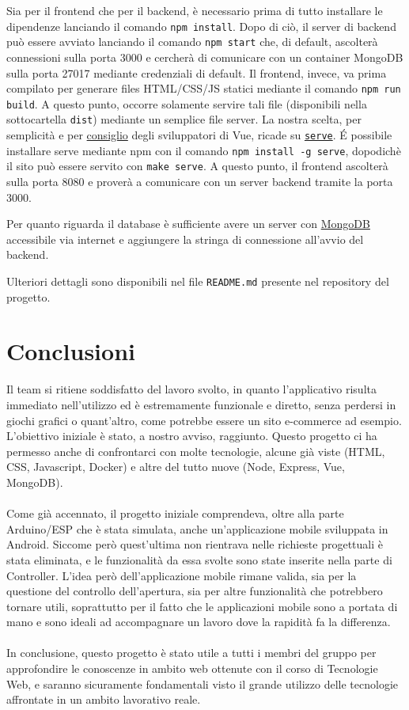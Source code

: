 \documentclass[a4paper,12pt]{report}
\newcommand{\mongodb}{\href{https://www.mongodb.com/it-it}{MongoDB} }
\begin{document}
Sia per il frontend che per il backend, è necessario prima di tutto installare le dipendenze lanciando il comando \texttt{npm install}. Dopo di ciò, il server di backend può essere avviato lanciando il comando \texttt{npm start} che, di default, ascolterà connessioni sulla porta 3000 e cercherà di comunicare con un container MongoDB sulla porta 27017 mediante credenziali di default. Il frontend, invece, va prima compilato per generare files HTML/CSS/JS statici mediante il comando \texttt{npm run build}. A questo punto, occorre solamente servire tali file (disponibili nella sottocartella \texttt{dist}) mediante un semplice file server. La nostra scelta, per semplicità e per \href{https://cli.vuejs.org/guide/deployment.html}{consiglio} degli sviluppatori di Vue, ricade su \href{https://www.npmjs.com/package/serve}{\texttt{serve}}. \'E possibile installare serve mediante npm con il comando \texttt{npm install -g serve}, dopodichè il sito può essere servito con \texttt{make serve}. A questo punto, il frontend ascolterà sulla porta 8080 e proverà a comunicare con un server backend tramite la porta 3000.

Per quanto riguarda il database è sufficiente avere un server con \mongodb accessibile via internet e aggiungere la stringa di connessione all'avvio del backend.

Ulteriori dettagli sono disponibili nel file \texttt{README.md} presente nel repository del progetto.

\clearpage
\chapter{Conclusioni}

Il team si ritiene soddisfatto del lavoro svolto, in quanto l'applicativo risulta immediato nell'utilizzo ed è estremamente funzionale e diretto, senza perdersi in giochi grafici o quant'altro, come potrebbe essere un sito e-commerce ad esempio. L'obiettivo iniziale è stato, a nostro avviso, raggiunto. Questo progetto ci ha permesso anche di confrontarci con molte tecnologie, alcune già viste (HTML, CSS, Javascript, Docker) e altre del tutto nuove (Node, Express, Vue, MongoDB).\\\\
Come già accennato, il progetto iniziale comprendeva, oltre alla parte Arduino/ESP che è stata simulata, anche un'applicazione mobile sviluppata in Android. Siccome però quest'ultima non rientrava nelle richieste progettuali è stata eliminata, e le funzionalità da essa svolte sono state inserite nella parte di Controller. L'idea però dell'applicazione mobile rimane valida, sia per la questione del controllo dell'apertura, sia per altre funzionalità che potrebbero tornare utili, soprattutto per il fatto che le applicazioni mobile sono a portata di mano e sono ideali ad accompagnare un lavoro dove la rapidità fa la differenza.\\\\
In conclusione, questo progetto è stato utile a tutti i membri del gruppo per approfondire le conoscenze in ambito web ottenute con il corso di Tecnologie Web, e saranno sicuramente fondamentali visto il grande utilizzo delle tecnologie affrontate in un ambito lavorativo reale.
\end{document}
